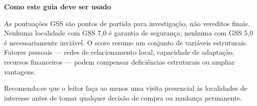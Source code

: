 \medskip

\textbf{Como este guia deve ser usado}

As pontuações GSS são pontos de partida para investigação, não vereditos finais. Nenhuma localidade com GSS 7,0 é garantia de segurança; nenhuma com GSS 5,0 é necessariamente inviável. O score resume um conjunto de variáveis estruturais. Fatores pessoais --- redes de relacionamento local, capacidade de adaptação, recursos financeiros --- podem compensar deficiências estruturais ou ampliar vantagens.

Recomenda-se que o leitor faça ao menos uma visita presencial às localidades de interesse antes de tomar qualquer decisão de compra ou mudança permanente.

\clearpage
